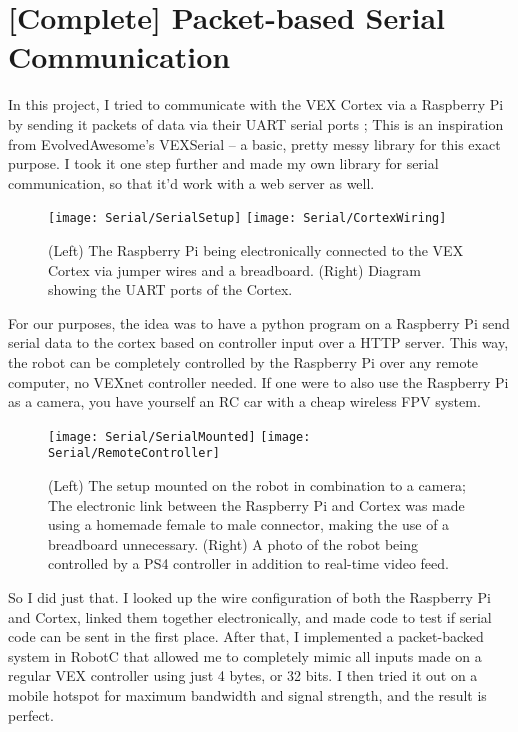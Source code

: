 ﻿\section{[Complete] Packet-based Serial Communication}
In this project, I tried to communicate with the VEX Cortex via a Raspberry Pi by sending it packets of data via their UART serial ports \cite{UARTBasic}; This is an inspiration from EvolvedAwesome's VEXSerial \cite{VEXSerial} -- a basic, pretty messy library for this exact purpose. I took it one step further and made my own library for serial communication, so that it'd work with a web server as well.

\begin{figure}[h]
    \centering
    \texttt{[image: Serial/SerialSetup]}
    \texttt{[image: Serial/CortexWiring]}
    \caption{
        (Left) The Raspberry Pi being electronically connected to the VEX Cortex via jumper wires and a breadboard. (Right) Diagram showing the UART ports of the Cortex. \cite{CortexWiringCite}
    }
\end{figure}

For our purposes, the idea was to have a python program on a Raspberry Pi send serial data to the cortex based on controller input over a HTTP server. This way, the robot can be completely controlled by the Raspberry Pi over any remote computer, no VEXnet controller needed. If one were to also use the Raspberry Pi as a camera, you have yourself an RC car with a cheap wireless FPV system.

\begin{figure}[h]
    \centering

    \texttt{[image: Serial/SerialMounted]}
    \texttt{[image: Serial/RemoteController]}
    \caption {
        (Left) The setup mounted on the robot in combination to a camera; The electronic link between the Raspberry Pi and Cortex was made using a homemade female to male connector, making the use of a breadboard unnecessary. (Right) A photo of the robot being controlled by a PS4 controller in addition to real-time video feed.
    }
\end{figure}

So I did just that. I looked up the wire configuration of both the Raspberry Pi and Cortex, linked them together electronically, and made code to test if serial code can be sent in the first place. After that, I implemented a packet-backed system in RobotC that allowed me to completely mimic all inputs made on a regular VEX controller using just 4 bytes, or 32 bits. I then tried it out on a mobile hotspot for maximum bandwidth and signal strength, and the result is perfect.


